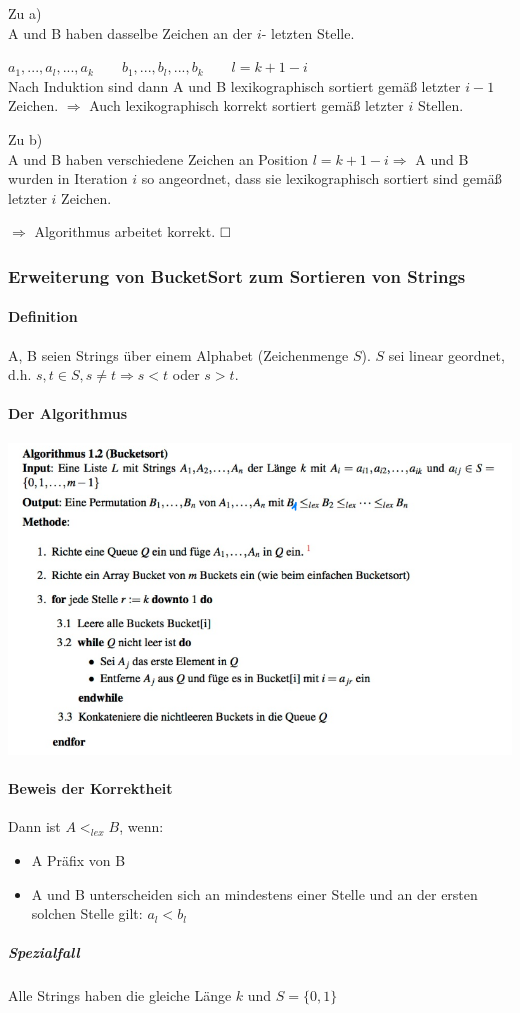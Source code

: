 \documentclass[fleqn]{scrartcl}
\begin{document}
Zu a)\\
A und B haben dasselbe Zeichen an der $i$- letzten Stelle.

$a_1, ..., a_l, ..., a_k \quad\quad b_1, ..., b_l, ..., b_k \quad\quad l = k + 1 -i$\\
Nach Induktion sind dann A und B lexikographisch sortiert gemäß letzter $i-1$ Zeichen. $\Rightarrow$ Auch lexikographisch korrekt sortiert gemäß letzter $i$ Stellen.

Zu b)\\
A und B haben verschiedene Zeichen an Position $l = k + 1 -i \Rightarrow$ A und B wurden in Iteration $i$ so angeordnet, dass sie lexikographisch sortiert sind gemäß letzter $i$ Zeichen.

$\Rightarrow$ Algorithmus arbeitet korrekt. $\hfill \square$
\subsubsection{Erweiterung von BucketSort zum Sortieren von Strings}
\paragraph{Definition} A, B seien Strings über einem Alphabet (Zeichenmenge $S$). $S$ sei linear geordnet, d.h. $s, t \in S, s \neq t \Rightarrow s < t$ oder $s > t$.
\newpage
\paragraph{Der Algorithmus}
\begin{center}
\includegraphics[width=\textwidth]{./BucketsortbeiStrings.png}
\end{center}
\paragraph{Beweis der Korrektheit}
Dann ist $A <_{lex} B$, wenn:
\begin{itemize}
\item A Präfix von B
\item A und B unterscheiden sich an mindestens einer Stelle und an der ersten solchen Stelle gilt: $a_l < b_l$
\end{itemize}
\subparagraph{Spezialfall} Alle Strings haben die gleiche Länge $k$ und $S = \{0, 1\}$
\end{document}
